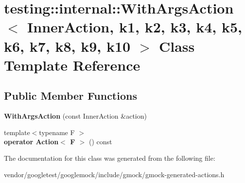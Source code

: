 \hypertarget{classtesting_1_1internal_1_1_with_args_action}{}\section{testing\+:\+:internal\+:\+:With\+Args\+Action$<$ Inner\+Action, k1, k2, k3, k4, k5, k6, k7, k8, k9, k10 $>$ Class Template Reference}
\label{classtesting_1_1internal_1_1_with_args_action}
\subsection*{Public Member Functions}
\begin{DoxyCompactItemize}
\item 
\mbox{\label{classtesting_1_1internal_1_1_with_args_action_ab408f9c56c8f25564ef554b984e1c926}} 
{\bfseries With\+Args\+Action} (const Inner\+Action \&action)
\item 
\mbox{\label{classtesting_1_1internal_1_1_with_args_action_ab6d8f89fd5a54f2914da2523b2ba6ee5}} 
{\footnotesize template$<$typename F $>$ }\\{\bfseries operator Action$<$ F $>$} () const
\end{DoxyCompactItemize}


The documentation for this class was generated from the following file\+:\begin{DoxyCompactItemize}
\item 
vendor/googletest/googlemock/include/gmock/gmock-\/generated-\/actions.\+h\end{DoxyCompactItemize}
